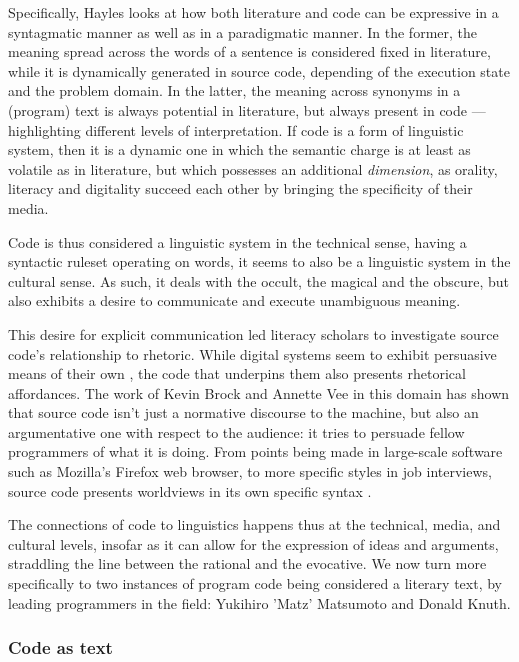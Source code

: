 Specifically, Hayles looks at how both literature and code can be expressive in a syntagmatic manner as well as in a paradigmatic manner. In the former, the meaning spread across the words of a sentence is considered fixed in literature, while it is dynamically generated in source code, depending of the execution state and the problem domain. In the latter, the meaning across synonyms in a (program) text is always potential in literature, but always present in code \citep{hayles_print_2004}—highlighting different levels of interpretation. If code is a form of linguistic system, then it is a dynamic one in which the semantic charge is at least as volatile as in literature, but which possesses an additional \emph{dimension}, as orality, literacy and digitality succeed each other by bringing the specificity of their media.

Code is thus considered a linguistic system in the technical sense, having a syntactic ruleset operating on words, it seems to also be a linguistic system in the cultural sense. As such, it deals with the occult, the magical and the obscure, but also exhibits a desire to communicate and execute unambiguous meaning.

This desire for explicit communication led literacy scholars to investigate source code's relationship to rhetoric. While digital systems seem to exhibit persuasive means of their own \citep{bogost_rhetoric_2007} \citep{frasca_simulation_2013}, the code that underpins them also presents rhetorical affordances. The work of Kevin Brock and Annette Vee in this domain has shown that source code isn't just a normative discourse to the machine, but also an argumentative one with respect to the audience: it tries to persuade fellow programmers of what it is doing. From points being made in large-scale software such as Mozilla's Firefox web browser, to more specific styles in job interviews, source code presents worldviews in its own specific syntax \citep{brock_rhetorical_2019}.

The connections of code to linguistics happens thus at the technical, media, and cultural levels, insofar as it can allow for the expression of ideas and arguments, straddling the line between the rational and the evocative. We now turn more specifically to two instances of program code being considered a literary text, by leading programmers in the field: Yukihiro 'Matz' Matsumoto and Donald Knuth.

\subsubsection{Code as text}

